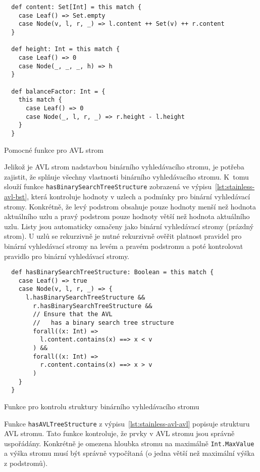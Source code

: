 \begin{listing}[H]
  \begin{verbatim}
  def content: Set[Int] = this match {
    case Leaf() => Set.empty
    case Node(v, l, r, _) => l.content ++ Set(v) ++ r.content
  }

  def height: Int = this match {
    case Leaf() => 0
    case Node(_, _, _, h) => h
  }

  def balanceFactor: Int = {
    this match {
      case Leaf() => 0
      case Node(_, l, r, _) => r.height - l.height
    }
  }
  \end{verbatim}
  \caption{Pomocné funkce pro AVL strom}
  \label{lst:stainless-avl-helper}
\end{listing}

Jelikož je AVL strom nadstavbou binárního vyhledávacího stromu,
je potřeba zajistit, že splňuje všechny vlastnosti binárního vyhledávacího stromu.
K~tomu slouží funkce \texttt{hasBinarySearchTreeStructure} zobrazená ve výpisu~\ref{lst:stainless-avl-bst},
která kontroluje hodnoty v uzlech a podmínky pro binární vyhledávací stromy.
Konkrétně, že levý podstrom obsahuje pouze hodnoty menší než hodnota aktuálního uzlu
a pravý podstrom pouze hodnoty větší než hodnota aktuálního uzlu.
Listy jsou automaticky označeny jako binární vyhledávací stromy (prázdný strom).
U uzlů se rekurzivně je nutné rekurzivně ověřit platnost pravidel pro
binární vyhledávací stromy na levém a pravém podstromu
a poté kontrolovat pravidlo pro binární vyhledávací stromy.

\begin{listing}[H]
  \begin{verbatim}
  def hasBinarySearchTreeStructure: Boolean = this match {
    case Leaf() => true
    case Node(v, l, r, _) => {
      l.hasBinarySearchTreeStructure &&
        r.hasBinarySearchTreeStructure &&
        // Ensure that the AVL
        //   has a binary search tree structure
        forall((x: Int) =>
          l.content.contains(x) ==> x < v
        ) &&
        forall((x: Int) =>
          r.content.contains(x) ==> x > v
        )
    }
  }
  \end{verbatim}
  \caption{Funkce pro kontrolu struktury binárního vyhledávacího stromu}
  \label{lst:stainless-avl-bst}
\end{listing}

Funkce \texttt{hasAVLTreeStructure} z výpisu~\ref{lst:stainless-avl-avl}
popisuje strukturu AVL stromu.
Tato funkce kontroluje, že prvky v AVL stromu jsou správně uspořádány.
Konkrétně je omezena hloubka stromu na maximálně \texttt{Int.MaxValue}
a výška stromu musí být správně vypočítaná (o jedna větší než maximální výška z podstromů).

